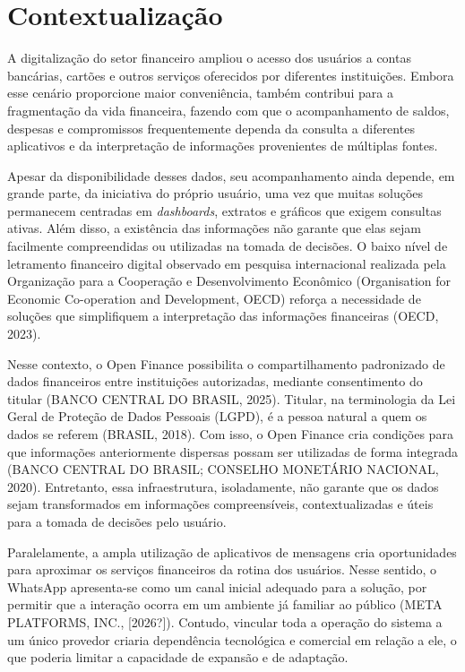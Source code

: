 \chapter{Contextualização}\label{chap:contexto}

A digitalização do setor financeiro ampliou o acesso dos usuários a contas bancárias, cartões e outros serviços oferecidos por diferentes instituições. Embora esse cenário proporcione maior conveniência, também contribui para a fragmentação da vida financeira, fazendo com que o acompanhamento de saldos, despesas e compromissos frequentemente dependa da consulta a diferentes aplicativos e da interpretação de informações provenientes de múltiplas fontes.

Apesar da disponibilidade desses dados, seu acompanhamento ainda depende, em grande parte, da iniciativa do próprio usuário, uma vez que muitas soluções permanecem centradas em \textit{dashboards}, extratos e gráficos que exigem consultas ativas. Além disso, a existência das informações não garante que elas sejam facilmente compreendidas ou utilizadas na tomada de decisões. O baixo nível de letramento financeiro digital observado em pesquisa internacional realizada pela Organização para a Cooperação e Desenvolvimento Econômico (Organisation for Economic Co-operation and Development, OECD) reforça a necessidade de soluções que simplifiquem a interpretação das informações financeiras (OECD, 2023).

Nesse contexto, o Open Finance possibilita o compartilhamento padronizado de dados financeiros entre instituições autorizadas, mediante consentimento do titular (BANCO CENTRAL DO BRASIL, 2025). Titular, na terminologia da Lei Geral de Proteção de Dados Pessoais (LGPD), é a pessoa natural a quem os dados se referem (BRASIL, 2018). Com isso, o Open Finance cria condições para que informações anteriormente dispersas possam ser utilizadas de forma integrada (BANCO CENTRAL DO BRASIL; CONSELHO MONETÁRIO NACIONAL, 2020). Entretanto, essa infraestrutura, isoladamente, não garante que os dados sejam transformados em informações compreensíveis, contextualizadas e úteis para a tomada de decisões pelo usuário.

Paralelamente, a ampla utilização de aplicativos de mensagens cria oportunidades para aproximar os serviços financeiros da rotina dos usuários. Nesse sentido, o WhatsApp apresenta-se como um canal inicial adequado para a solução, por permitir que a interação ocorra em um ambiente já familiar ao público (META PLATFORMS, INC., [2026?]). Contudo, vincular toda a operação do sistema a um único provedor criaria dependência tecnológica e comercial em relação a ele, o que poderia limitar a capacidade de expansão e de adaptação.

